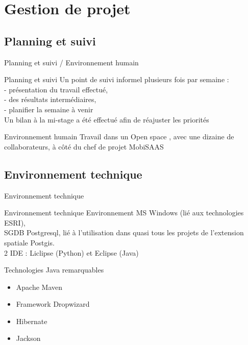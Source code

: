 \documentclass[utf8,compress]{beamer}
\begin{document}
\section{Gestion de projet}
\subsection{Planning et suivi }
\begin{frame}{Planning et suivi / Environnement humain }
\begin{block}{Planning et suivi}
Un point de suivi informel plusieurs fois par semaine :\\
	- présentation du travail effectué, \\
	- des résultats intermédiaires,\\ 
	- planifier la semaine à venir\\
	
Un bilan à la mi-stage a été effectué afin de réajuster les priorités
\end{block}
\begin{block}{Environnement humain}
	Travail dans un \og Open space \fg, avec une dizaine de collaborateurs, à côté du chef de projet \og MobiSAAS \fg{} 
\end{block}
\end{frame}
\subsection{Environnement technique}
\begin{frame}{Environnement technique}
\begin{block}{Environnement technique}
	Environnement MS Windows (lié aux technologies ESRI),\\
	
	SGDB Postgresql, lié à l'utilisation dans quasi tous les projets de l'extension spatiale Postgis.\\
	
	2 IDE : Liclipse (Python) et Eclipse (Java)\\
	
\end{block}
\begin{block}{Technologies Java remarquables }
\begin{itemize}
\item Apache Maven
\item Framework \og Dropwizard \fg
\item Hibernate
\item Jackson
\end{itemize} 
\end{block}
\end{frame}
\end{document}
